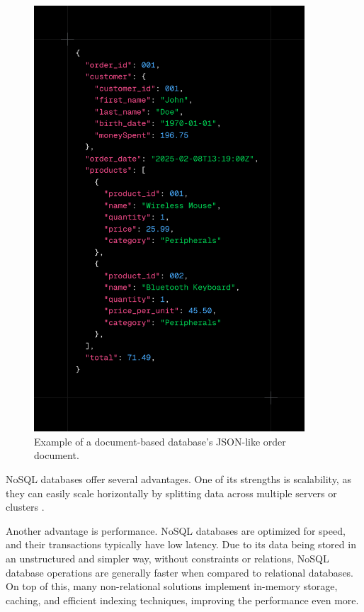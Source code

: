 \begin{figure}[htbp]
	\centering
	\includegraphics[width=0.9\textwidth, height=0.5\textheight, keepaspectratio]{Chapters/Figures/Databases/NoSQL.png}
	\caption{Example of a document-based database's \gls{JSON}-like order document.}
	\label{fig:databases:NoSQL}
\end{figure}

\gls{NoSQL} databases offer several advantages. One of its strengths is scalability,
as they can easily scale horizontally by splitting data across
multiple servers or clusters \cite{Yadav2024}.

Another advantage is performance. \gls{NoSQL} databases are optimized for speed,
and their transactions typically have low latency. Due to its data being stored
in an unstructured and simpler way, without constraints or relations, \gls{NoSQL}
database operations are generally faster when compared to relational databases.
On top of this, many non-relational solutions implement in-memory storage,
caching, and efficient indexing techniques, improving the performance even more.

